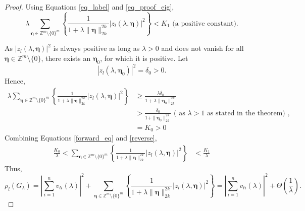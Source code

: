\documentclass[multixcb]{amstext-l}
\theoremstyle{plain}
\theoremstyle{definition}
\theoremstyle{definition}
\theoremstyle{remark}
\numberwithin{equation}{chapter}
\begin{document}
\begin{proof}
Using Equations \ref{eq_label} and \ref{eq_proof_eig},
\begin{equation}\label{forward_eq}
\lambda\sum_{\boldsymbol{\eta}\in\mathbb{Z}^m\setminus\{0\}^m}\left\{ \frac{1}{1+\lambda\|\boldsymbol{\eta}\|_{2k}^{2k}}\left|z_l(\lambda,\boldsymbol{\eta})\right|^2 \right\} < K_1 \mbox{   (a positive constant)}.
\end{equation}

As $\left|z_l(\lambda,\boldsymbol{\eta})\right|^2$ is always positive as long as $\lambda>0$ and does not vanish for all $\boldsymbol{\eta}\in\mathbb{Z}^m\setminus\{0\}$, there exists an $\boldsymbol{\eta}_0$, for which it is positive. Let \begin{equation}\label{delta}
\left|z_l(\lambda,\boldsymbol{\eta}_0)\right|^2 = \delta_0 > 0.
\end{equation}
Hence, \begin{equation}\label{reverse}
\begin{aligned}
\lambda\sum_{\boldsymbol{\eta}\in\mathbb{Z}^m\setminus\{0\}^m}\left\{ \frac{1}{1+\lambda\|\boldsymbol{\eta}\|_{2k}^{2k}}\left|z_l(\lambda,\boldsymbol{\eta})\right|^2 \right\} &\ge  \frac{\lambda\delta_0}{1+\lambda\|\boldsymbol{\eta}_0\|_{2k}^{2k}}\\
&> \frac{\delta_0}{1+\|\boldsymbol{\eta}_0\|_{2k}^{2k}}\mbox{               ( as  }\lambda >1 \mbox{ as stated in the theorem)       }, \\
&= K_0 > 0
\end{aligned}
\end{equation}
Combining Equations \ref{forward_eq} and \ref{reverse},
\begin{equation}
\label{pp}
\begin{aligned}
\frac{K_0}{\lambda} < \sum_{\boldsymbol{\eta}\in\mathbb{Z}^m\setminus\{0\}^m}\left\{ \frac{1}{1+\lambda\|\boldsymbol{\eta}\|_{2k}^{2k}}\left|z_l(\lambda,\boldsymbol{\eta})\right|^2 \right\} &< \frac{K_1}{\lambda} 
\end{aligned}
\end{equation}
Thus, $$\rho_l(G_{\lambda}) = \left|\sum\limits_{i=1}^nv_{li}(\lambda)\right|^2 +\sum_{\boldsymbol{\eta}\in\mathbb{Z}^m\setminus\{0\}^m}\left\{ \frac{1}{1+\lambda\|\boldsymbol{\eta}\|_{2k}^{2k}}\left|z_l(\lambda,\boldsymbol{\eta})\right|^2 \right\} = \left|\sum\limits_{i=1}^nv_{li}(\lambda)\right|^2 +\Theta(\frac{1}{\lambda}).$$ 


\end{proof}
\end{document}
